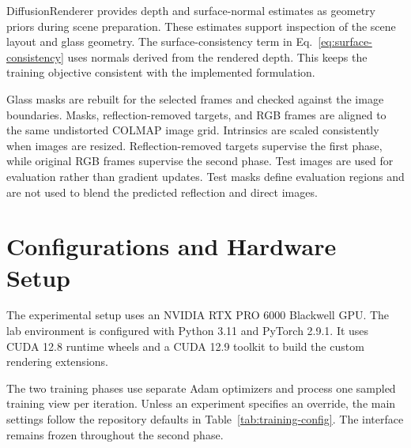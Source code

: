 DiffusionRenderer provides depth and surface-normal estimates as geometry priors during scene preparation. These estimates support inspection of the scene layout and glass geometry. The surface-consistency term in Eq.~\eqref{eq:surface-consistency} uses normals derived from the rendered depth. This keeps the training objective consistent with the implemented formulation.

Glass masks are rebuilt for the selected frames and checked against the image boundaries. Masks, reflection-removed targets, and RGB frames are aligned to the same undistorted COLMAP image grid. Intrinsics are scaled consistently when images are resized. Reflection-removed targets supervise the first phase, while original RGB frames supervise the second phase. Test images are used for evaluation rather than gradient updates. Test masks define evaluation regions and are not used to blend the predicted reflection and direct images.

\section{Configurations and Hardware Setup}

The experimental setup uses an NVIDIA RTX PRO 6000 Blackwell GPU. The lab environment is configured with Python 3.11 and PyTorch 2.9.1. It uses CUDA 12.8 runtime wheels and a CUDA 12.9 toolkit to build the custom rendering extensions.

The two training phases use separate Adam optimizers and process one sampled training view per iteration. Unless an experiment specifies an override, the main settings follow the repository defaults in Table~\ref{tab:training-config}. The interface remains frozen throughout the second phase.

